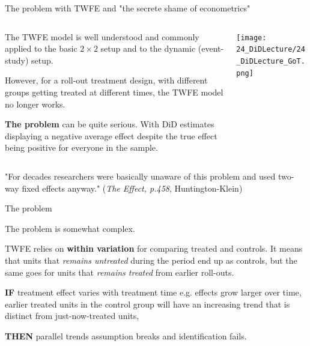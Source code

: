 \documentclass[notes,11pt, aspectratio=169]{beamer}
\newenvironment{wideitemize}{\itemize\addtolength{\itemsep}{10pt}}{\enditemize}
\begin{document}
\begin{frame}{The problem with TWFE and "the secrete shame of econometrics"}
\begin{columns}[T] %
    \begin{column}{0.6\textwidth}
      \begin{wideitemize} 
        \item The TWFE model is well understood and commonly applied to the basic $2\times2$ setup and to the dynamic (event-study) setup.
        \item However, for a roll-out treatment design, with different groups getting treated at different times, the TWFE model no longer works.
        \item \textbf{The problem} can be quite serious. With DiD estimates displaying a negative average effect despite the true effect being positive for everyone in the sample. 
            \end{wideitemize}
    \end{column}%
    \hfill%
    \begin{column}{.4\textwidth}
    \begin{center}
 \texttt{[image: 24\_DiDLecture/24\_DiDLecture\_GoT.png]}                 
    \end{center}
    \end{column}
  \end{columns}
  \begin{displayquote}
  "For decades researchers were basically unaware of this problem and used two-way fixed effects anyway."
  \flushright\tiny (\emph{The Effect, p.458}, Huntington-Klein)
\end{displayquote}
    \end{frame}

\begin{frame}{The problem}
      \begin{wideitemize}
        \item The problem is somewhat complex. 
        \item TWFE relies on \textbf{within variation} for comparing treated and controls. It means that units that \textit{remains untreated} during the period end up as controls, but the same goes for units that \textit{remains treated} from earlier roll-outs.
        \item \textbf{IF} treatment effect varies with treatment time e.g. effects grow larger over time, earlier treated units in the control group will have an increasing trend that is distinct from just-now-treated units, 
        \item \textbf{THEN} parallel trends assumption breaks and identification fails.  
        \end{wideitemize}
        \end{frame}
\end{document}
